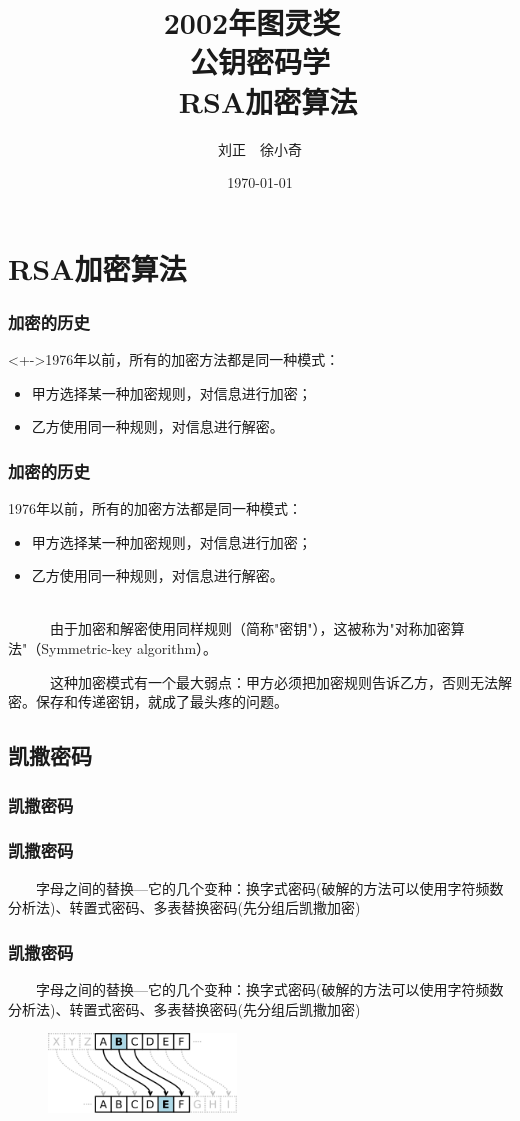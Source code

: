 \documentclass[slidestop,compress,mathserif]{beamer}
\title{2002年图灵奖~\\~公钥密码学~\\~RSA加密算法}
\author{刘正~~徐小奇}
\date{\today}
\begin{document}
\frame{\titlepage}

\section{RSA加密算法}

\begin{frame}
  \frametitle{加密的历史}
  
  \begin{block}<+->{1976年以前，所有的加密方法都是同一种模式：}
    \begin{itemize}[<+->]
        \item 甲方选择某一种加密规则，对信息进行加密；
        \item 乙方使用同一种规则，对信息进行解密。
    \end{itemize}
  \end{block}

\end{frame}

\begin{frame}
  \frametitle{加密的历史}
  
  \begin{block}{1976年以前，所有的加密方法都是同一种模式：}
    \begin{itemize}
        \item 甲方选择某一种加密规则，对信息进行加密；
        \item 乙方使用同一种规则，对信息进行解密。
    \end{itemize}
  \end{block}
  ~\\[0.6cm]

~ ~ ~ ~由于加密和解密使用同样规则（简称"密钥"），这被称为"对称加密算法"（Symmetric-key algorithm）。

~ ~ ~ ~这种加密模式有一个最大弱点：甲方必须把加密规则告诉乙方，否则无法解密。保存和传递密钥，就成了最头疼的问题。
\end{frame}

\subsection{\hfill 凯撒密码}
\begin{frame}
  \frametitle{凯撒密码}
\end{frame}
\begin{frame}
  \frametitle{凯撒密码}
  ~~~~字母之间的替换---它的几个变种：换字式密码(破解的方法可以使用字符频数分析法)、转置式密码、多表替换密码(先分组后凯撒加密)
\end{frame}
\begin{frame}
  \frametitle{凯撒密码}
  ~~~~字母之间的替换---它的几个变种：换字式密码(破解的方法可以使用字符频数分析法)、转置式密码、多表替换密码(先分组后凯撒加密)
  \begin{figure}
    \centering
    \includegraphics[width=5cm]{Caesar3.png}
  \end{figure}
\end{frame}
\end{document}
